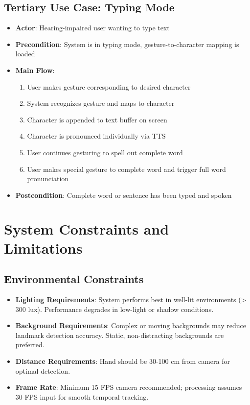 \subsection{Tertiary Use Case: Typing Mode}

\begin{itemize}
    \item \textbf{Actor}: Hearing-impaired user wanting to type text
    \item \textbf{Precondition}: System is in typing mode, gesture-to-character mapping is loaded
    \item \textbf{Main Flow}:
    \begin{enumerate}
        \item User makes gesture corresponding to desired character
        \item System recognizes gesture and maps to character
        \item Character is appended to text buffer on screen
        \item Character is pronounced individually via TTS
        \item User continues gesturing to spell out complete word
        \item User makes special gesture to complete word and trigger full word pronunciation
    \end{enumerate}
    \item \textbf{Postcondition}: Complete word or sentence has been typed and spoken
\end{itemize}

\section{System Constraints and Limitations}

\subsection{Environmental Constraints}

\begin{itemize}
    \item \textbf{Lighting Requirements}: System performs best in well-lit environments (> 300 lux). Performance degrades in low-light or shadow conditions.
    \item \textbf{Background Requirements}: Complex or moving backgrounds may reduce landmark detection accuracy. Static, non-distracting backgrounds are preferred.
    \item \textbf{Distance Requirements}: Hand should be 30-100 cm from camera for optimal detection.
    \item \textbf{Frame Rate}: Minimum 15 FPS camera recommended; processing assumes 30 FPS input for smooth temporal tracking.
\end{itemize}

